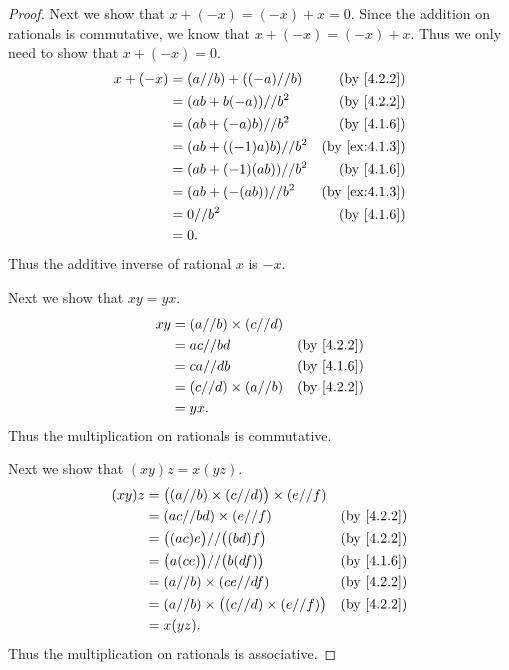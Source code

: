 \begin{proof}
  Next we show that \(x + (-x) = (-x) + x = 0\).
  Since the addition on rationals is commutative, we know that \(x + (-x) = (-x) + x\).
  Thus we only need to show that \(x + (-x) = 0\).
  \begin{align*}
    x + (-x) & = (a // b) + ((-a) // b) & \text{(by \cref{4.2.2})}    \\
             & = (ab + b(-a)) // b^2    & \text{(by \cref{4.2.2})}    \\
             & = (ab + (-a)b) // b^2    & \text{(by \cref{4.1.6})}    \\
             & = (ab + ((-1)a)b) // b^2 & \text{(by \cref{ex:4.1.3})} \\
             & = (ab + (-1)(ab)) // b^2 & \text{(by \cref{4.1.6})}    \\
             & = (ab + (-(ab)) // b^2   & \text{(by \cref{ex:4.1.3})} \\
             & = 0 // b^2               & \text{(by \cref{4.1.6})}    \\
             & = 0.
  \end{align*}
  Thus the additive inverse of rational \(x\) is \(-x\).

  Next we show that \(xy = yx\).
  \begin{align*}
    xy & = (a // b) \times (c // d)                            \\
       & = ac // bd                 & \text{(by \cref{4.2.2})} \\
       & = ca // db                 & \text{(by \cref{4.1.6})} \\
       & = (c // d) \times (a // b) & \text{(by \cref{4.2.2})} \\
       & = yx.
  \end{align*}
  Thus the multiplication on rationals is commutative.

  Next we show that \((xy)z = x(yz)\).
  \begin{align*}
    (xy)z & = \big((a // b) \times (c // d)\big) \times (e // f)                            \\
          & = (ac // bd) \times (e // f)                         & \text{(by \cref{4.2.2})} \\
          & = \big((ac)e\big) // \big((bd)f\big)                 & \text{(by \cref{4.2.2})} \\
          & = \big(a(ce)\big) // \big(b(df)\big)                 & \text{(by \cref{4.1.6})} \\
          & = (a // b) \times (ce // df)                         & \text{(by \cref{4.2.2})} \\
          & = (a // b) \times \big((c // d) \times (e // f)\big) & \text{(by \cref{4.2.2})} \\
          & = x(yz).
  \end{align*}
  Thus the multiplication on rationals is associative.


\end{proof}
